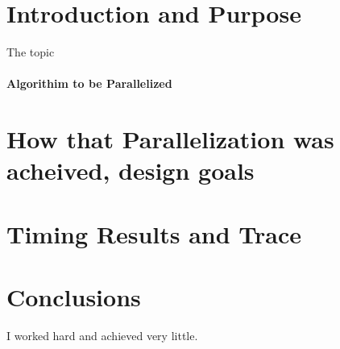 \documentclass[12pt]{article}
\begin{document}
\maketitle

\section{Introduction and Purpose}
The topic


\paragraph{Algorithim to be Parallelized}

\section{How that Parallelization was acheived, design goals}

\section{Timing Results and Trace}

\section{Conclusions}
I worked hard and achieved very little.
\end{document}

